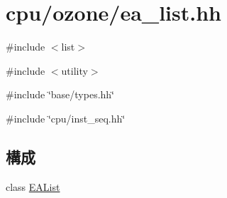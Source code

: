 \hypertarget{ea__list_8hh}{
\section{cpu/ozone/ea\_\-list.hh}
\label{ea__list_8hh}
}
{\ttfamily \#include $<$list$>$}\par
{\ttfamily \#include $<$utility$>$}\par
{\ttfamily \#include \char`\"{}base/types.hh\char`\"{}}\par
{\ttfamily \#include \char`\"{}cpu/inst\_\-seq.hh\char`\"{}}\par
\subsection*{構成}
\begin{DoxyCompactItemize}
\item 
class \hyperlink{classEAList}{EAList}
\end{DoxyCompactItemize}

